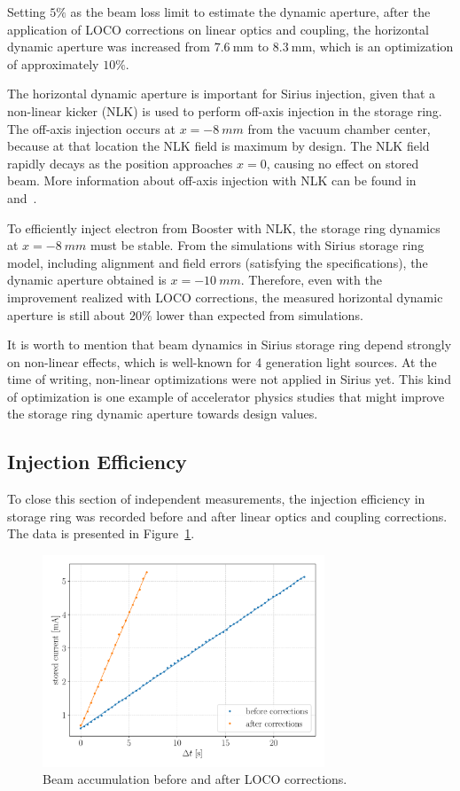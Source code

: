 Setting $5\%$ as the beam loss limit to estimate the dynamic aperture, after the application of LOCO corrections on linear optics and coupling, the horizontal dynamic aperture was increased from $\SI{7.6}{\milli\meter}$ to $\SI{8.3}{\milli\meter}$, which is an optimization of approximately $10\%$.

The horizontal dynamic aperture is important for Sirius injection, given that a non-linear kicker (NLK) is used to perform off-axis injection in the storage ring. The off-axis injection occurs at $x=\SI{-8}{mm}$ from the vacuum chamber center, because at that location the NLK field is maximum by design. The NLK field rapidly decays as the position approaches $x=0$, causing no effect on stored beam. More information about off-axis injection with NLK can be found in~\cite{liu2016a} and~\cite{wikinlk}.

To efficiently inject electron from Booster with NLK, the storage ring dynamics at $x=\SI{-8}{mm}$ must be stable. From the simulations with Sirius storage ring model, including alignment and field errors (satisfying the specifications), the dynamic aperture obtained is $x=\SI{-10}{mm}$. Therefore, even with the improvement realized with LOCO corrections, the measured horizontal dynamic aperture is still about $20\%$ lower than expected from simulations. 

It is worth to mention that beam dynamics in Sirius storage ring depend strongly on non-linear effects, which is well-known for 4 generation light sources. At the time of writing, non-linear optimizations were not applied in Sirius yet. This kind of optimization is one example of accelerator physics studies that might improve the storage ring dynamic aperture towards design values.

\subsection{Injection Efficiency}
To close this section of independent measurements, the injection efficiency in storage ring was recorded before and after linear optics and coupling corrections. The data is presented in Figure~\ref{fig:injeff}.
\begin{figure}[h!]
\centering
\includegraphics[width=0.75\textwidth]{figures/injeff_grid.pdf}
\caption{Beam accumulation before and after LOCO corrections.}
\label{fig:injeff}
\end{figure}

